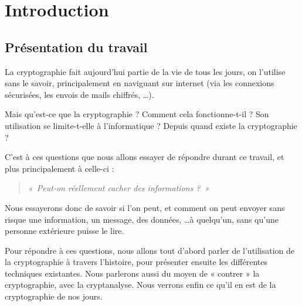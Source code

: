 \chapter{Introduction}
\thispagestyle{empty}

\section{Présentation du travail}
La cryptographie fait aujourd'hui partie de la vie de tous les jours,
on l'utilise sans le savoir, principalement en naviguant sur internet
(via les connexions sécurisées, les envois de mails chiffrés, \dots).

Mais qu'est-ce que la cryptographie ? Comment cela
fonctionne-t-il ? Son utilisation se limite-t-elle à l'informatique ?
Depuis quand existe la cryptographie ?

C'est à ces questions que nous allons essayer de répondre durant ce
travail, et plus principalement à celle-ci :

\begin{quote}
\emph{«~Peut-on réellement cacher des informations ?~»}
\end{quote}

Nous essayerons donc de savoir si l'on peut, et comment on peut 
envoyer sans risque une information, un message, des données, \dots à
quelqu'un, sans qu'une personne extérieure puisse le lire.

Pour répondre à ces questions, nous allons tout d'abord parler de
l'utilisation  de la cryptographie
à travers l'histoire, pour présenter ensuite les
différentes techniques existantes. Nous parlerons
aussi du moyen de « contrer » la cryptographie, avec la
cryptanalyse. Nous verrons enfin ce qu'il en est de la
cryptographie de nos jours. 


